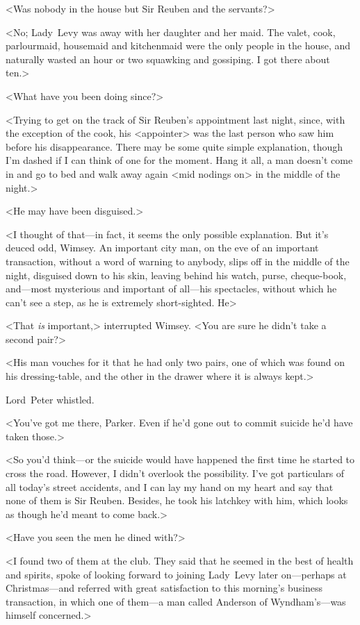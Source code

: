 <Was nobody in the house but Sir Reuben and the servants?>

<No; Lady~Levy was away with her daughter and her maid. The valet, cook, parlourmaid, housemaid and kitchenmaid were the only people in the house, and naturally wasted an hour or two squawking and gossiping. I got there about ten.>

<What have you been doing since?>

<Trying to get on the track of Sir Reuben's appointment last night, since, with the exception of the cook, his <appointer> was the last person who saw him before his disappearance. There may be some quite simple explanation, though I'm dashed if I can think of one for the moment. Hang it all, a man doesn't come in and go to bed and walk away again <mid nodings on> in the middle of the night.>

<He may have been disguised.>

<I thought of that—in fact, it seems the only possible explanation. But it's deuced odd, Wimsey. An important city man, on the eve of an important transaction, without a word of warning to anybody, slips off in the middle of the night, disguised down to his skin, leaving behind his watch, purse, cheque-book, and—most mysterious and important of all—his spectacles, without which he can't see a step, as he is extremely short-sighted. He\longdash>

<That \emph{is} important,> interrupted Wimsey. <You are sure he didn't take a second pair?>

<His man vouches for it that he had only two pairs, one of which was found on his dressing-table, and the other in the drawer where it is always kept.>

Lord~Peter whistled.

<You've got me there, Parker. Even if he'd gone out to commit suicide he'd have taken those.>

<So you'd think—or the suicide would have happened the first time he started to cross the road. However, I didn't overlook the possibility. I've got particulars of all today's street accidents, and I can lay my hand on my heart and say that none of them is Sir Reuben. Besides, he took his latchkey with him, which looks as though he'd meant to come back.>

<Have you seen the men he dined with?>

<I found two of them at the club. They said that he seemed in the best of health and spirits, spoke of looking forward to joining Lady~Levy later on—perhaps at Christmas—and referred with great satisfaction to this morning's business transaction, in which one of them—a man called Anderson of Wyndham's—was himself concerned.>

